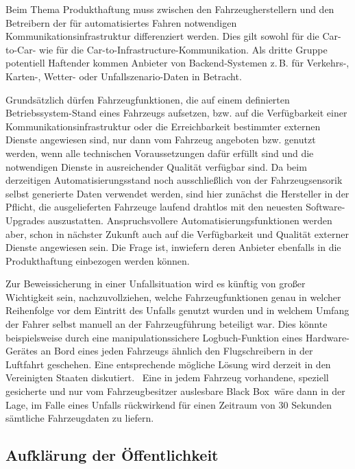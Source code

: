 \documentclass[twoside,a4paper,12pt]{article}
\begin{document}
Beim Thema Produkthaftung muss zwischen den Fahrzeugherstellern und den Betreibern der für automatisiertes Fahren notwendigen
Kommunikationsinfrastruktur differenziert werden. Dies gilt sowohl für die Car-to-Car- wie für die Car-to-Infrastructure-Kommunikation.
Als dritte Gruppe potentiell Haftender kommen Anbieter von Backend-Systemen z.\,B. für Verkehrs-, Karten-, Wetter- oder Unfallszena\-rio-Daten 
in Betracht. 

Grundsätzlich dürfen Fahrzeugfunktionen, die auf einem definierten \glqq Betriebssys\-tem\grqq-Stand eines Fahrzeugs aufsetzen, bzw. auf die 
Verfügbarkeit einer Kommunikationsinfrastruktur oder die Erreichbarkeit bestimmter externen Dienste angewiesen sind, nur dann vom Fahrzeug 
angeboten bzw. genutzt werden, wenn alle technischen Voraussetzungen dafür erfüllt sind und die notwendigen Dienste in ausreichender 
Qualität verfügbar sind. Da beim derzeitigen Automatisierungsstand noch ausschließlich von der Fahrzeugsensorik selbst generierte Daten verwendet werden, 
sind hier zunächst die Hersteller in der Pflicht, die ausgelieferten Fahrzeuge laufend drahtlos mit den neuesten Software-Upgrades auszustatten.
Anspruchsvollere Automatisierungsfunktionen werden aber, schon in nächster Zukunft auch auf die Verfügbarkeit und Qualität externer Dienste 
angewiesen sein. Die Frage ist, inwiefern deren Anbieter ebenfalls in die Produkthaftung einbezogen werden können.

Zur Beweissicherung in einer Unfallsituation wird es künftig von großer Wichtigkeit sein, nachzuvollziehen, welche Fahrzeugfunktionen genau in welcher 
Reihenfolge vor dem Eintritt des Unfalls genutzt wurden und in welchem Umfang der Fahrer selbst manuell an der Fahrzeugführung beteiligt war. Dies 
könnte beispielsweise durch eine manipulationssichere Logbuch-Funktion eines Hardware-Gerätes an Bord eines jeden Fahrzeugs ähnlich den Flugschreibern 
in der Luftfahrt geschehen. Eine entsprechende mögliche Lösung wird derzeit in den Vereinigten Staaten diskutiert.~\cite{epic} Eine in jedem Fahrzeug
vorhandene, speziell gesicherte und nur vom Fahrzeugbesitzer auslesbare \glqq Black Box\grqq\ wäre dann in der Lage, im Falle eines Unfalls rückwirkend 
für einen Zeitraum von 30 Sekunden sämtliche Fahrzeugdaten zu liefern.

\subsection{Aufklärung der Öffentlichkeit} \label{AufklaerungDerOeffentlichkeit}
\end{document}
